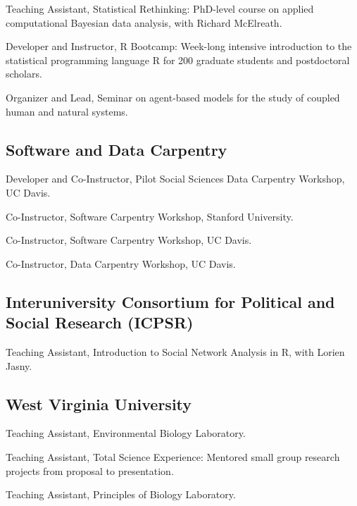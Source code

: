 \begin{description}
\tightlist
\item[2016]
Teaching Assistant, Statistical Rethinking: PhD-level course on applied
computational Bayesian data analysis, with Richard McElreath.
\item[2015]
Developer and Instructor, R Bootcamp: Week-long intensive introduction
to the statistical programming language R for 200 graduate students and
postdoctoral scholars.
\item[2013]
Organizer and Lead, Seminar on agent-based models for the study of
coupled human and natural systems.
\end{description}

\subsection{Software and Data
Carpentry}\label{software-and-data-carpentry}

\begin{description}
\tightlist
\item[2016]
Developer and Co-Instructor, Pilot Social Sciences Data Carpentry
Workshop, UC Davis.
\item[2016]
Co-Instructor, Software Carpentry Workshop, Stanford University.
\item[2016]
Co-Instructor, Software Carpentry Workshop, UC Davis.
\item[2015]
Co-Instructor, Data Carpentry Workshop, UC Davis.
\end{description}

\subsection{Interuniversity Consortium for Political and Social Research
(ICPSR)}\label{interuniversity-consortium-for-political-and-social-research-icpsr}

\begin{description}
\tightlist
\item[2015]
Teaching Assistant, Introduction to Social Network Analysis in R, with
Lorien Jasny.
\end{description}

\subsection{West Virginia University}\label{west-virginia-university}

\begin{description}
\tightlist
\item[2011]
Teaching Assistant, Environmental Biology Laboratory.
\item[2010 - 2011]
Teaching Assistant, Total Science Experience: Mentored small group
research projects from proposal to presentation.
\item[2009 - 2010]
Teaching Assistant, Principles of Biology Laboratory.
\end{description}

